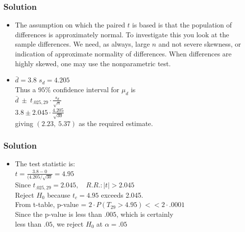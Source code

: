 \documentclass[xcolor=dvipsnames,12pt]{beamer}
\begin{document}
 \begin{frame}
\frametitle{ Solution}
\begin{itemize}
\item[a.] The assumption on which the paired $t$ is based is 
that the population of differences is approximately normal.  To
investigate this you look at the sample differences.  We
need, as always, large $n$ and not severe skewness, or indication
of approximate normality of differences. When differences are 
highly skewed, one may use the nonparametric test.\\
\item[b.] $\bar{d}  = 3.8$ \quad  $s_d=4.205 $  \\ 
\hspace*{.3in}Thus a  $95\%$ confidence interval for $\mu_d$ is \\
\hspace*{.6in} $\bar{d}\ \pm\ t_{.025,29} \cdot \frac{s_d}{\sqrt{n}}$\\[.1in]
\hspace*{.6in} $3.8  \pm 2.045 \cdot \frac{4.205}{\sqrt{30}}$\\
\enlargethispage*{.2in}
\hspace*{.3in} giving $(2.23,\ 5.37)$ as the required estimate.
\end{itemize}
\end{frame}

\begin{frame}
\frametitle{ Solution}
\begin{itemize}
\item[c.] The test statistic is:\\
\hspace*{.6in} $t =\frac{ 3.8-0}{(4.205/\sqrt{30}} = 4.95$\\[.1in]
\hspace*{.3in} Since $t_{.025,29} = 2.045,\quad R.R.: |t|>2.045$\\
\hspace*{.3in} Reject $H_0$ because $t_c= 4.95 $ exceeds 2.045.\\[.1in]
\hspace*{.3in} From t-table, p-value = $2 \cdot P(T_{29}>4.95) <<2 \cdot .0001$\\
\hspace*{.3in} Since the p-value is less than $.005$, which is certainly\\
\hspace*{.3in} less than $.05$, we reject $H_0$ at  $\alpha =.05$\\[.1in]
\end{itemize}
\end{frame}
\end{document}
